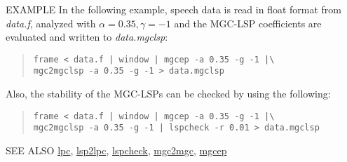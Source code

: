 \begin{qsection}{EXAMPLE}
In the following example, speech data is read in float format from
{\em data.f}, analyzed with $\alpha = 0.35, \gamma = -1$
and the MGC-LSP coefficients are evaluated and written to {\em data.mgclsp}:
\begin{quote}
\verb!frame < data.f | window | mgcep -a 0.35 -g -1 |\!\\
\verb!mgc2mgclsp -a 0.35 -g -1 > data.mgclsp!
\end{quote}
Also, the stability of the MGC-LSPs can be checked by using the following:
\begin{quote}
\verb!frame < data.f | window | mgcep -a 0.35 -g -1 |\!\\
\verb!mgc2mgclsp -a 0.35 -g -1 | lspcheck -r 0.01 > data.mgclsp !
\end{quote}
\end{qsection}

\begin{qsection}{SEE ALSO}
\hyperlink{lpc}{lpc},
\hyperlink{lsp2lpc}{lsp2lpc},
\hyperlink{lspcheck}{lspcheck},
\hyperlink{mgc2mgc}{mgc2mgc},
\hyperlink{mgcep}{mgcep}
\end{qsection}

